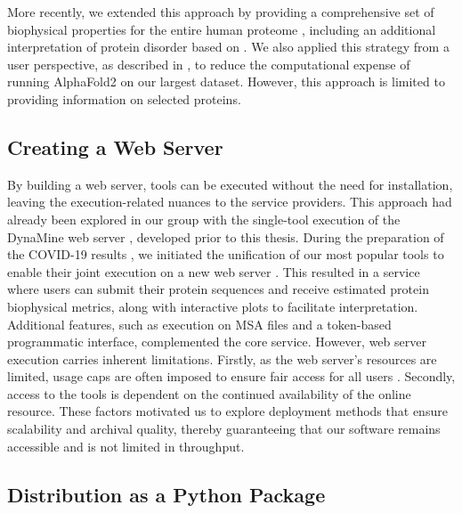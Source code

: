 More recently, we extended this approach by providing a comprehensive set of biophysical properties for the entire human proteome \cite{bio2byte_bio2bytes_nodate}, including an additional interpretation of protein disorder based on \cite{roca-martinez_challenges_2022}. We also applied this strategy from a user perspective, as described in \cite{gavalda-garcia_gradations_2024}, to reduce the computational expense of running AlphaFold2 on our largest dataset. However, this approach is limited to providing information on selected proteins.


\subsection{Creating a Web Server}

By building a web server, tools can be executed without the need for installation, leaving the execution-related nuances to the service providers. This approach had already been explored in our group with the single-tool execution of the DynaMine web server \cite{cilia_protein_2013, cilia_dynamine_2014}, developed prior to this thesis. During the preparation of the COVID-19 results \cite{kagami_online_2021}, we initiated the unification of our most popular tools to enable their joint execution on a new web server \cite{kagami_b2btools_2021}. This resulted in a service where users can submit their protein sequences and receive estimated protein biophysical metrics, along with interactive plots to facilitate interpretation. Additional features, such as execution on MSA files and a token-based programmatic interface, complemented the core service. However, web server execution carries inherent limitations. Firstly, as the web server's resources are limited, usage caps are often imposed to ensure fair access for all users \cite{abramson_accurate_2024, kagami_b2btools_2021}. Secondly, access to the tools is dependent on the continued availability of the online resource. These factors motivated us to explore deployment methods that ensure scalability and archival quality, thereby guaranteeing that our software remains accessible and is not limited in throughput.

\subsection{Distribution as a Python Package}

